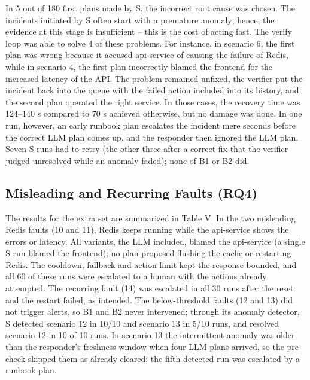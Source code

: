 \documentclass[conference,a4paper]{IEEEtran}
\begin{document}
In 5 out of 180 first plans made by S, the incorrect root cause was chosen. The incidents initiated by S often start with a premature anomaly; hence, the evidence at this stage is insufficient -- this is the cost of acting fast. The verify loop was able to solve 4 of these problems. For instance, in scenario 6, the first plan was wrong because it accused api-service of causing the failure of Redis, while in scenario 4, the first plan incorrectly blamed the frontend for the increased latency of the API. The problem remained unfixed, the verifier put the incident back into the queue with the failed action included into its history, and the second plan operated the right service. In those cases, the recovery time was 124--140 s compared to 70 s achieved otherwise, but no damage was done. In one run, however, an early runbook plan escalates the incident mere seconds before the correct LLM plan comes up, and the responder then ignored the LLM plan. Seven S runs had to retry (the other three after a correct fix that the verifier judged unresolved while an anomaly faded); none of B1 or B2 did.

\subsection{Misleading and Recurring Faults (RQ4)}

The results for the extra set are summarized in Table V. In the two misleading Redis faults (10 and 11), Redis keeps running while the api-service shows the errors or latency. All variants, the LLM included, blamed the api-service (a single S run blamed the frontend); no plan proposed flushing the cache or restarting Redis. The cooldown, fallback and action limit kept the response bounded, and all 60 of these runs were escalated to a human with the actions already attempted. The recurring fault (14) was escalated in all 30 runs after the reset and the restart failed, as intended. The below-threshold faults (12 and 13) did not trigger alerts, so B1 and B2 never intervened; through its anomaly detector, S detected scenario 12 in 10/10 and scenario 13 in 5/10 runs, and resolved scenario 12 in 10 of 10 runs. In scenario 13 the intermittent anomaly was older than the responder's freshness window when four LLM plans arrived, so the pre-check skipped them as already cleared; the fifth detected run was escalated by a runbook plan.
\end{document}
